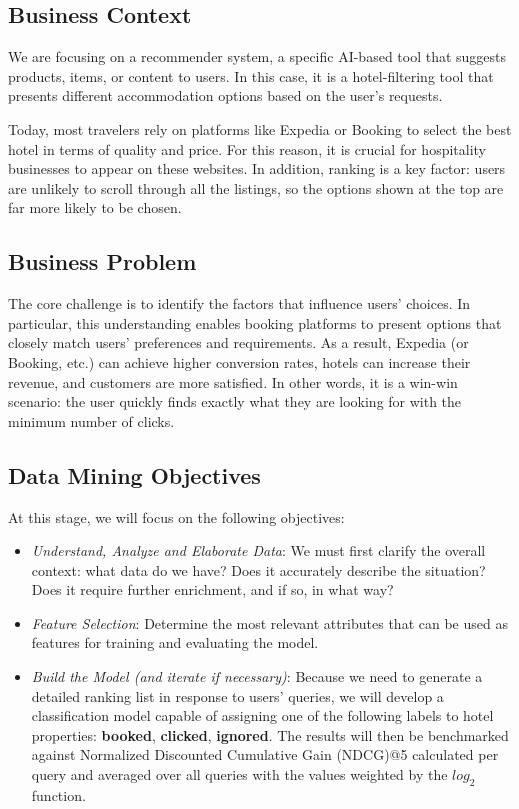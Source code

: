 \documentclass[runningheads]{llncs}
\begin{document}
\subsection{Business Context}

We are focusing on a recommender system, a specific AI-based tool that suggests products, items, or content to users. In this case, it is a hotel-filtering tool that presents different accommodation options based on the user’s requests.

Today, most travelers rely on platforms like Expedia or Booking to select the best hotel in terms of quality and price. For this reason, it is crucial for hospitality businesses to appear on these websites. In addition, ranking is a key factor: users are unlikely to scroll through all the listings, so the options shown at the top are far more likely to be chosen.

\subsection{Business Problem}

The core challenge is to identify the factors that influence users’ choices. In particular, this understanding enables booking platforms to present options that closely match users’ preferences and requirements. As a result, Expedia (or Booking, etc.) can achieve higher conversion rates, hotels can increase their revenue, and customers are more satisfied. In other words, it is a win-win scenario: the user quickly finds exactly what they are looking for with the minimum number of clicks.

\subsection{Data Mining Objectives}

At this stage, we will focus on the following objectives:
\begin{itemize}
    \item \textit{Understand, Analyze and Elaborate Data}: We must first clarify the overall context: what data do we have? Does it accurately describe the situation? Does it require further enrichment, and if so, in what way?
    \item \textit{Feature Selection}: Determine the most relevant attributes that can be used as features for training and evaluating the model.
    \item \textit{Build the Model (and iterate if necessary)}: Because we need to generate a detailed ranking list in response to users’ queries, we will develop a classification model capable of assigning one of the following labels to hotel properties: \textbf{booked}, \textbf{clicked}, \textbf{ignored}. The results will then be benchmarked against Normalized Discounted Cumulative Gain (NDCG)@5 calculated per query and averaged over all queries with the values weighted by the $log_2$
function.
\end{itemize}
\end{document}
